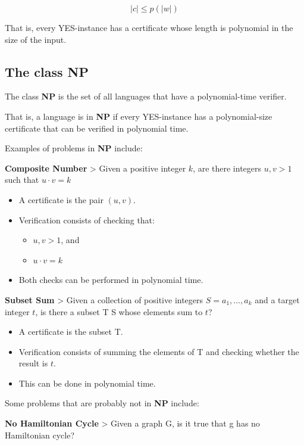 \documentclass[11pt]{article}
\providecommand{\tightlist}{%
      \setlength{\itemsep}{0pt}\setlength{\parskip}{0pt}}
\begin{document}
\[
|c| \leq p(|w|)
\]

That is, every YES-instance has a certificate whose length is polynomial
in the size of the input.

    \subsection{\texorpdfstring{The class
\textbf{NP}}{The class NP}}\label{the-class-np}

The class \textbf{NP} is the set of all languages that have a
polynomial-time verifier.

That is, a language is in \textbf{NP} if every YES-instance has a
polynomial-size certificate that can be verified in polynomial time.

Examples of problems in \textbf{NP} include:

\textbf{Composite Number} \textgreater{} Given a positive integer \(k\),
are there integers \(u, v > 1\) such that \(u \cdot v = k\)

\begin{itemize}
\tightlist
\item
  A certificate is the pair \((u,v)\).
\item
  Verification consists of checking that:

  \begin{itemize}
  \tightlist
  \item
    \(u,v>1\), and
  \item
    \(u \cdot v=k\)
  \end{itemize}
\item
  Both checks can be performed in polynomial time.
\end{itemize}

\textbf{Subset Sum} \textgreater{} Given a collection of positive
integers \(S = {a_1, \ldots, a_k}\) and a target integer \(t\), is there
a subset T \subseteq S whose elements sum to \(t\)?

\begin{itemize}
\tightlist
\item
  A certificate is the subset T.
\item
  Verification consists of summing the elements of T and checking
  whether the result is \(t\).
\item
  This can be done in polynomial time.
\end{itemize}

Some problems that are probably not in \textbf{NP} include:

\textbf{No Hamiltonian Cycle} \textgreater{} Given a graph G, is it true
that g has no Hamiltonian cycle?
\end{document}
